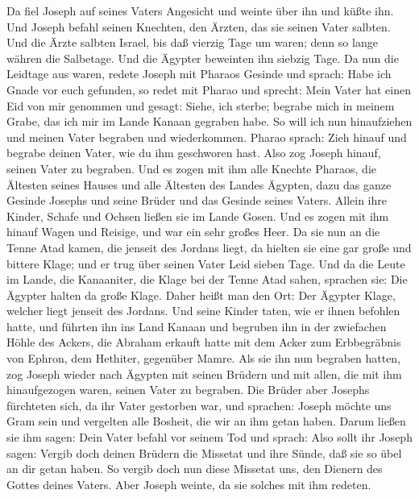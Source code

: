  Da fiel Joseph auf seines Vaters Angesicht und weinte über
ihn und küßte ihn.  Und Joseph befahl seinen Knechten, den
Ärzten, das sie seinen Vater salbten. Und die Ärzte salbten Israel,
 bis daß vierzig Tage um waren; denn so lange währen die
Salbetage. Und die Ägypter beweinten ihn siebzig Tage.  Da
nun die Leidtage aus waren, redete Joseph mit Pharaos Gesinde und
sprach: Habe ich Gnade vor euch gefunden, so redet mit Pharao und
sprecht:  Mein Vater hat einen Eid von mir genommen und
gesagt: Siehe, ich sterbe; begrabe mich in meinem Grabe, das ich mir im
Lande Kanaan gegraben habe. So will ich nun hinaufziehen und meinen
Vater begraben und wiederkommen.  Pharao sprach: Zieh hinauf
und begrabe deinen Vater, wie du ihm geschworen hast.  Also
zog Joseph hinauf, seinen Vater zu begraben. Und es zogen mit ihm alle
Knechte Pharaos, die Ältesten seines Hauses und alle Ältesten des Landes
Ägypten,  dazu das ganze Gesinde Josephs und seine Brüder
und das Gesinde seines Vaters. Allein ihre Kinder, Schafe und Ochsen
ließen sie im Lande Gosen.  Und es zogen mit ihm hinauf
Wagen und Reisige, und war ein sehr großes Heer.  Da sie
nun an die Tenne Atad kamen, die jenseit des Jordans liegt, da hielten
sie eine gar große und bittere Klage; und er trug über seinen Vater Leid
sieben Tage.  Und da die Leute im Lande, die Kanaaniter,
die Klage bei der Tenne Atad sahen, sprachen sie: Die Ägypter halten da
große Klage. Daher heißt man den Ort: Der Ägypter Klage, welcher liegt
jenseit des Jordans.  Und seine Kinder taten, wie er ihnen
befohlen hatte,  und führten ihn ins Land Kanaan und
begruben ihn in der zwiefachen Höhle des Ackers, die Abraham erkauft
hatte mit dem Acker zum Erbbegräbnis von Ephron, dem Hethiter, gegenüber
Mamre.  Als sie ihn nun begraben hatten, zog Joseph wieder
nach Ägypten mit seinen Brüdern und mit allen, die mit ihm hinaufgezogen
waren, seinen Vater zu begraben.  Die Brüder aber Josephs
fürchteten sich, da ihr Vater gestorben war, und sprachen: Joseph möchte
uns Gram sein und vergelten alle Bosheit, die wir an ihm getan haben.
 Darum ließen sie ihm sagen: Dein Vater befahl vor seinem
Tod und sprach:  Also sollt ihr Joseph sagen: Vergib doch
deinen Brüdern die Missetat und ihre Sünde, daß sie so übel an dir getan
haben. So vergib doch nun diese Missetat uns, den Dienern des Gottes
deines Vaters. Aber Joseph weinte, da sie solches mit ihm redeten.

